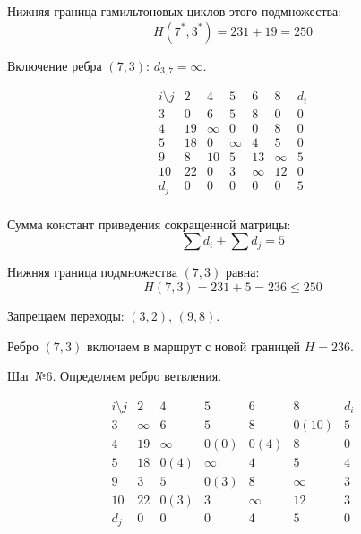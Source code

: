 \documentclass{article}
\begin{document}
Нижняя граница гамильтоновых циклов этого подмножества:
\[
    H(7^*,3^*) = 231 + 19 = 250
\]

Включение ребра $(7,3)$: $d_{3,7}=\infty$.

\[
    \begin{array}{c|ccccc|c}
        i \setminus j & 2  & 4      & 5      & 6      & 8      & d_i \\
        \hline
        3             & 0  & 6      & 5      & 8      & 0      & 0   \\
        4             & 19 & \infty & 0      & 0      & 8      & 0   \\
        5             & 18 & 0      & \infty & 4      & 5      & 0   \\
        9             & 8  & 10     & 5      & 13     & \infty & 5   \\
        10            & 22 & 0      & 3      & \infty & 12     & 0   \\
        \hline
        d_j           & 0  & 0      & 0      & 0      & 0      & 5   \\
    \end{array}
\]

Сумма констант приведения сокращенной матрицы:
\[
    \sum d_i + \sum d_j = 5
\]

Нижняя граница подмножества $(7,3)$ равна:
\[
    H(7,3) = 231 + 5 = 236 \leq 250
\]

Запрещаем переходы: $(3,2)$, $(9,8)$.

Ребро $(7,3)$ включаем в маршрут с новой границей $H=236$.

Шаг №6.
Определяем ребро ветвления.

\[
    \begin{array}{c|ccccc|c}
        i \setminus j & 2      & 4      & 5      & 6      & 8      & d_i \\
        \hline
        3             & \infty & 6      & 5      & 8      & 0(10)  & 5   \\
        4             & 19     & \infty & 0(0)   & 0(4)   & 8      & 0   \\
        5             & 18     & 0(4)   & \infty & 4      & 5      & 4   \\
        9             & 3      & 5      & 0(3)   & 8      & \infty & 3   \\
        10            & 22     & 0(3)   & 3      & \infty & 12     & 3   \\
        \hline
        d_j           & 0      & 0      & 0      & 4      & 5      & 0   \\
    \end{array}
\]
\end{document}
